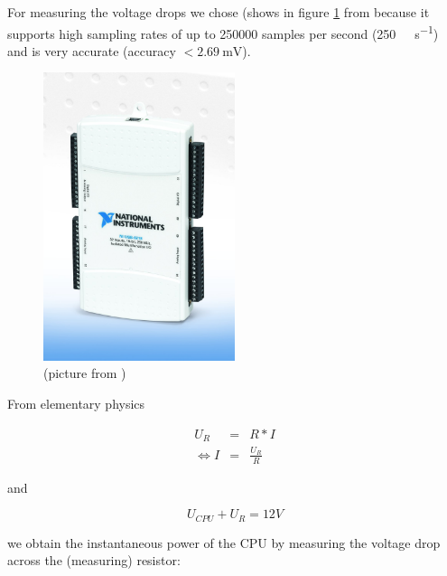 \label{sec:measuring-device}

For measuring the voltage drops we chose \JWPni{} (shows in figure \ref{fig:ni}
from  because it supports
high sampling rates of up to 250000 samples per second
(\SI{250}{\kilo\samples\per\second}) and is very accurate (accuracy $<
\SI{2.69}{\milli\volt}$)\cite{NISpec2009}.

\begin{figure}
  \centering
    \includegraphics[width=0.5\textwidth]{fig/NI-USB-6218.jpg}
  \caption{\JWPni{} (picture from )}
  \label{fig:ni}
\end{figure}


\label{sec:calc-work}

From elementary physics

\begin{eqnarray}
     U_R & = & R * I \\
  \iff I & = & \frac{U_R}{R}
\end{eqnarray}

and

\begin{equation}
  U_{CPU} + U_{R} = 12 V
\end{equation}

we obtain the instantaneous power of the CPU by measuring the voltage drop
across the (measuring) resistor:

